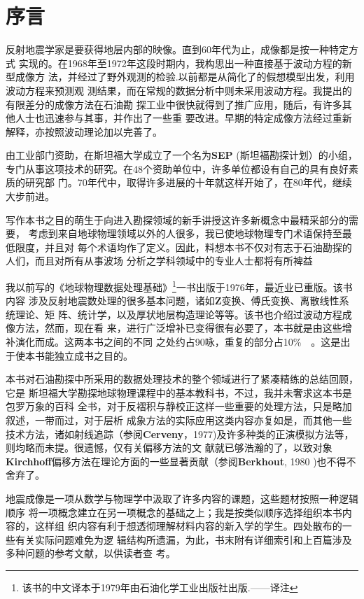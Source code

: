 {\section*{序言}}

反射地震学家是要获得地层内部的映像。直到60年代为止，成像都是按一种特定方式
实现的。在1968年至1972年这段时期内，我构思出一种直接基于波动方程的新型成像方
法，并经过了野外观测的检验.以前都是从简化了的假想模型出发，利用波动方程来预测观
测结果，而在常规的数据分析中则未采用波动方程。我提出的有限差分的成像方法在石油勘
探工业中很快就得到了推广应用，随后，有许多其他人士也迅速参与其事，并作出了一些重
要改进。早期的特定成像方法经过重新解释，亦按照波动理论加以完善了。

由工业部门资助，在斯坦福大学成立了一个名为\textbf{SEP}
(斯坦福勘探计划）的小组，专门从事这项技术的研究。在48个资助单位中，许多单位都设有自己的具有良好素质的研究部
门。70年代中，取得许多进展的十年就这样开始了，在80年代，继续大步前进。

写作本书之目的萌生于向进入勘探领域的新手讲授这许多新概念中最精采部分的需要，
考虑到来自地球物理领域以外的人很多，我已使地球物理专门术语保持至最低限度，并且对
每个术语均作了定义。因此，料想本书不仅对有志于石油勘探的人们，而且对所有从事波场
分析之学科领域中的专业人士都将有所裨益

我以前写的《地球物理数据处理基础》\footnote{该书的中文译本于1979年由石油化学工业出版社出版.——译注}一书出版于1976年，最近业已重版。该书内容
涉及反射地震数处理的很多基本问题，诸如\textbf{Z}变换、傅氏变换、离散线性系统理论、矩
阵、统计学，以及厚状地层构造理论等等。该书也介绍过波动方程成像方法，然而，现在看
来，进行广泛增补已变得很有必要了，本书就是由这些增补演化而成。这两本书之间的不同
之处约占90咏，重复的部分占10\%　。这是出于使本书能独立成书之目的。

本书对石油勘探中所采用的数据处理技术的整个领域进行了紧凑精练的总结回顾，它是
斯坦福大学勘探地球物理课程中的基本教科书，不过，我并未奢求这本书是包罗万象的百科
全书，对于反褶积与静校正这样一些重要的处理方法，只是略加叙述，一带而过，对于层析
成象方法的实际应用这类内容亦复如是，而其他一些技术方法，诸如射线追踪（参阅\textbf{Cerveny}，1977)及许多种类的正演模拟方法等，则均略而未提。很遗憾，仅有关偏移方法的文
献就已够浩瀚的了，以致对象\textbf{Kirchhoff}偏移方法在理论方面的一些显著贡献（参阅\textbf{Berkhout}, 1980 )也不得不舍弃了。

地震成像是一项从数学与物理学中汲取了许多内容的课题，这些题材按照一种逻辑顺序
将一项概念建立在另一项概念的基础之上；我是按类似顺序选择组织本书内容的，这样组
织内容有利于想透彻理解材料内容的新入学的学生。四处散布的一些有关实际问题难免为逻
辑结构所遗漏，为此，书末附有详细索引和上百篇涉及多种问题的参考文献，以供读者查
考。

